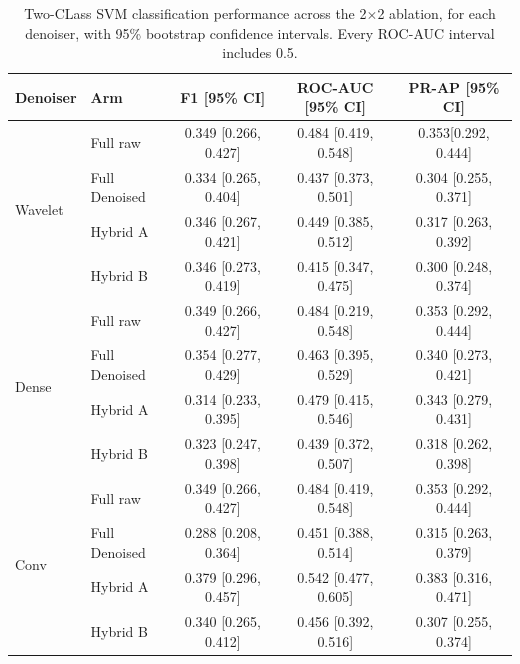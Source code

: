 \documentclass[ %
                    author={Daniel Page},
                supervisor={Dr. Andrew Calway},
                    degree={MSc},
                     title={Some Structural Guidelines for Data Science MSc Theses, Including Those With Long Titles that Run Across Multiple Lines on the Front Page},
                  subtitle={And those including an optional subtitle too, for good measure},
                      type={},
                      year={2021}]{dissertation}
\begin{document}
\begin{table}[H]
    \centering
    \begin{tabular}{llccc}
    \toprule
     Denoiser & Arm & F1 [95\% CI] & ROC-AUC [95\% CI] & PR-AP [95\% CI] \\
     \midrule
     \multirow{4}{*}{Wavelet}
    & Full raw &  0.349 [0.266, 0.427] & 0.484 [0.419, 0.548] & 0.353[0.292, 0.444] \\
    & Full Denoised & 0.334 [0.265, 0.404] & 0.437 [0.373, 0.501] & 0.304 [0.255, 0.371] \\
    & Hybrid A & 0.346 [0.267, 0.421] & 0.449 [0.385, 0.512] & 0.317 [0.263, 0.392] \\
    & Hybrid B & 0.346 [0.273, 0.419] &  0.415 [0.347, 0.475] & 0.300 [0.248, 0.374] \\
    \midrule
    \multirow{4}{*}{Dense}
    & Full raw & 0.349 [0.266, 0.427] & 0.484 [0.219, 0.548] & 0.353 [0.292, 0.444] \\
    & Full Denoised & 0.354 [0.277, 0.429] & 0.463 [0.395, 0.529] & 0.340 [0.273, 0.421] \\
    & Hybrid A & 0.314 [0.233, 0.395] & 0.479 [0.415, 0.546] & 0.343 [0.279, 0.431] \\
    & Hybrid B & 0.323 [0.247, 0.398] & 0.439 [0.372, 0.507] & 0.318 [0.262, 0.398] \\
    \midrule
    \multirow{4}{*}{Conv}
    & Full raw & 0.349 [0.266, 0.427] & 0.484 [0.419, 0.548] & 0.353 [0.292, 0.444] \\
    & Full Denoised & 0.288 [0.208, 0.364] & 0.451 [0.388, 0.514] & 0.315 [0.263, 0.379] \\
    & Hybrid A & 0.379 [0.296, 0.457] & 0.542 [0.477, 0.605] & 0.383 [0.316, 0.471] \\
    & Hybrid B & 0.340 [0.265, 0.412] & 0.456 [0.392, 0.516] & 0.307 [0.255, 0.374] \\
    \bottomrule
    \end{tabular}
    \caption{Two-CLass SVM classification performance across the 2$\times$2 ablation, for each denoiser, with 95\% bootstrap confidence intervals. Every ROC-AUC interval includes 0.5.} 
    \label{tab:Twoclass-cis}
\end{table}
\end{document}
